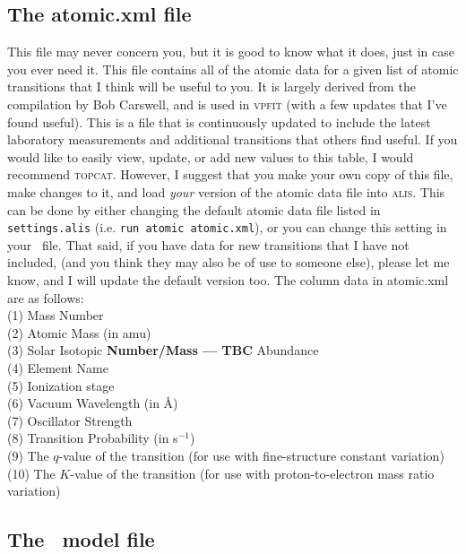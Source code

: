 \subsection{The atomic.xml file}

This file may never concern you, but it is good to know what it
does, just in case you ever need it. This file contains all of the
atomic data for a given list of atomic transitions that I think will
be useful to you. It is largely derived from the compilation by
Bob Carswell, and is used in \textsc{vpfit} (with a few updates
that I've found useful). This is a file that is continuously updated
to include the latest laboratory measurements and additional
transitions that others find useful. If you would like to easily view,
update, or add new values to this table, I would recommend
\textsc{topcat}. However, I suggest that you make your own
copy of this file, make changes to it, and load \textit{your}
version of the atomic data file into \textsc{alis}. This can be
done by either changing the default atomic data file listed
in \texttt{settings.alis} (i.e. \texttt{run atomic atomic.xml}), or
you can change this setting in your \dmod\ file. That said, if
you have data for new transitions that I have not included,
(and you think they may also be of use to someone else),
please let me know, and I will update the default version too.
The column data in atomic.xml are as follows:\\

\indent (1) Mass Number\\
\indent (2) Atomic Mass (in amu)\\
\indent (3) Solar Isotopic \textbf{Number/Mass --- TBC} Abundance\\
\indent (4) Element Name\\
\indent (5) Ionization stage\\
\indent (6) Vacuum Wavelength (in \AA)\\
\indent (7) Oscillator Strength\\
\indent (8) Transition Probability (in s$^{-1}$)\\
\indent (9) The $q$-value of the transition (for use with fine-structure constant variation)\\
\indent (10) The $K$-value of the transition (for use with proton-to-electron mass ratio variation)\\

\subsection{The \dmod\ model file}
\label{sec:dmod}

